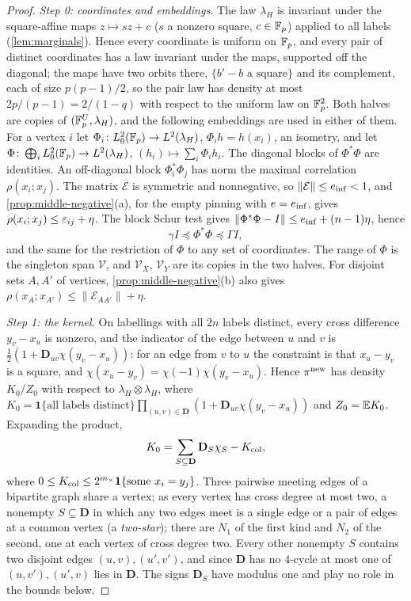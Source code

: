 \begin{proof}
\emph{Step 0: coordinates and embeddings.} The law $\lambda_H$ is invariant
under the square-affine maps $z\mapsto sz+c$ ($s$ a nonzero square, $c\in\mathbb F_p$)
applied to all labels (\cref{lem:marginals}). Hence every coordinate is
uniform on $\mathbb F_p$, and every pair of distinct coordinates has a law invariant
under the maps, supported off the diagonal; the maps have two orbits there,
$\{b'-b\text{ a square}\}$ and its complement, each of size $p(p-1)/2$, so
the pair law has density at most $2p/(p-1)=2/(1-q)$ with respect to the
uniform law on $\mathbb F_p^2$. Both halves are copies of $(\mathbb F_p^U,\lambda_H)$, and the
following embeddings are used in either of them. For a vertex $i$ let
$\Phi_i\colon L^2_0(\mathbb F_p)\to L^2(\lambda_H)$, $\Phi_ih=h(x_i)$, an isometry, and let
$\Phi\colon\bigoplus_iL^2_0(\mathbb F_p)\to L^2(\lambda_H)$, $(h_i)\mapsto\sum_i\Phi_ih_i$.
The diagonal blocks of $\Phi^*\Phi$ are identities. An off-diagonal block
$\Phi_i^*\Phi_j$ has norm the maximal correlation $\rho(x_i;x_j)$. The matrix
$\mathcal E$ is symmetric and nonnegative, so $\|\mathcal E\|\le e_{\rm inf}<1$,
and \cref{prop:middle-negative}(a), for the empty pinning with
$e=e_{\rm inf}$, gives $\rho(x_i;x_j)\le\varepsilon_{ij}+\eta$. The block Schur test
gives $\|\Phi^*\Phi-I\|\le e_{\rm inf}+(n-1)\eta$, hence
\[
 \gamma I\preceq\Phi^*\Phi\preceq\Gamma I,
\]
and the same for the restriction of $\Phi$ to any set of coordinates. The range
of $\Phi$ is the singleton span $\mathcal V$, and $\mathcal V_X$, $\mathcal V_Y$ are
its copies in the two halves. For disjoint sets $A,A'$ of vertices,
\cref{prop:middle-negative}(b) also gives
$\rho(x_A;x_{A'})\le\|\mathcal E_{AA'}\|+\eta$.

\emph{Step 1: the kernel.} On labellings with all $2n$ labels distinct, every
cross difference $y_v-x_u$ is nonzero, and the indicator of the edge between $u$
and $v$ is $\frac12(1+\mathbf D_{uv}\chi(y_v-x_u))$: for an edge from $v$ to $u$
the constraint is that $x_u-y_v$ is a square, and
$\chi(x_u-y_v)=\chi(-1)\chi(y_v-x_u)$. Hence $\pi^{\rm new}$ has density $K_0/Z_0$
with respect to $\lambda_H\otimes\lambda_H$, where
$K_0=\mathbf 1\{\text{all labels distinct}\}\prod_{(u,v)\in\mathbf D}
(1+\mathbf D_{uv}\chi(y_v-x_u))$ and $Z_0=\mathbb E K_0$. Expanding the product,
\[
 K_0=\sum_{S\subseteq\mathbf D}\mathbf D_S\chi_S-K_{\rm col},
\]
where $0\le K_{\rm col}\le2^{m_\times}\mathbf 1\{\text{some }x_i=y_j\}$. Three
pairwise meeting edges of a bipartite graph share a vertex; as every vertex has
cross degree at most two, a nonempty $S\subseteq\mathbf D$ in which any two edges
meet is a single edge or a pair of edges at a common vertex (a \emph{two-star});
there are $N_1$ of the first kind and $N_2$ of the second, one at each vertex of
cross degree two. Every other nonempty $S$ contains two disjoint edges
$(u,v),(u',v')$, and since $\mathbf D$ has no $4$-cycle at most one of
$(u,v'),(u',v)$ lies in $\mathbf D$. The signs $\mathbf D_S$ have modulus one and
play no role in the bounds below.


\end{proof}
